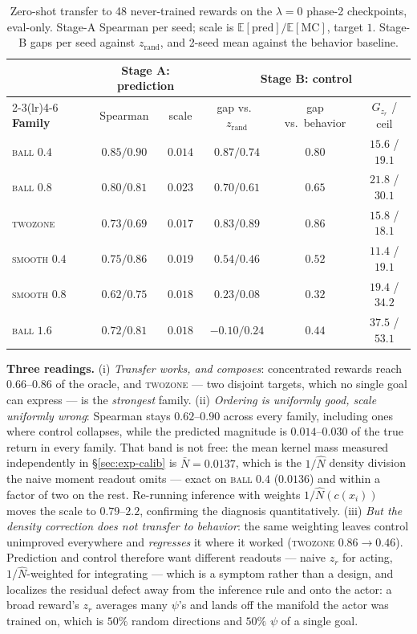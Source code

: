 \documentclass[10pt]{article}
\newcommand{\E}{\mathbb{E}}
\begin{document}
\begin{table}[h]
\centering\small
\setlength{\tabcolsep}{5pt}
\begin{tabular}{l c c c c c}
\toprule
& \multicolumn{2}{c}{\textbf{Stage A: prediction}} & \multicolumn{3}{c}{\textbf{Stage B: control}} \\
\cmidrule(lr){2-3}\cmidrule(lr){4-6}
\textbf{Family} & Spearman & scale & gap vs.\ $z_{\text{rand}}$ & gap vs.\ behavior & $G_{z_r}$ / ceil \\
\midrule
\textsc{ball} $0.4$   & $0.85/0.90$ & $0.014$ & $0.87/0.74$ & $0.80$ & $15.6$ / $19.1$ \\
\textsc{ball} $0.8$   & $0.80/0.81$ & $0.023$ & $0.70/0.61$ & $0.65$ & $21.8$ / $30.1$ \\
\textsc{twozone}      & $0.73/0.69$ & $0.017$ & $\mathbf{0.83/0.89}$ & $\mathbf{0.86}$ & $15.8$ / $18.1$ \\
\textsc{smooth} $0.4$ & $0.75/0.86$ & $0.019$ & $0.54/0.46$ & $0.52$ & $11.4$ / $19.1$ \\
\textsc{smooth} $0.8$ & $0.62/0.75$ & $0.018$ & $\mathbf{0.23/0.08}$ & $0.32$ & $19.4$ / $34.2$ \\
\textsc{ball} $1.6$   & $0.72/0.81$ & $0.018$ & $\mathbf{-0.10/0.24}$ & $0.44$ & $37.5$ / $53.1$ \\
\bottomrule
\end{tabular}
\caption{Zero-shot transfer to 48 never-trained rewards on the $\lambda{=}0$
phase-2 checkpoints, eval-only. Stage-A Spearman per seed; scale is
$\E[\text{pred}]/\E[\text{MC}]$, target $1$. Stage-B gaps per seed against
$z_{\text{rand}}$, and 2-seed mean against the behavior baseline.}
\label{tab:l2}
\end{table}

\textbf{Three readings.} (i) \emph{Transfer works, and composes}: concentrated
rewards reach $0.66$--$0.86$ of the oracle, and \textsc{twozone} --- two disjoint
targets, which no single goal can express --- is the \emph{strongest} family.
(ii) \emph{Ordering is uniformly good, scale uniformly wrong}: Spearman stays
$0.62$--$0.90$ across every family, including ones where control collapses, while
the predicted magnitude is $0.014$--$0.030$ of the true return in every family.
That band is not free: the mean kernel mass measured independently in
\S\ref{sec:exp-calib} is $\bar N = 0.0137$, which is the $1/\hat N$ density
division the naive moment readout omits --- exact on \textsc{ball} $0.4$
($0.0136$) and within a factor of two on the rest. Re-running inference
with weights $1/\hat N(c(x_i))$ moves the scale to $0.79$--$2.2$, confirming the
diagnosis quantitatively. (iii) \emph{But the density correction does not transfer
to behavior}: the same weighting leaves control unimproved everywhere and
\emph{regresses} it where it worked (\textsc{twozone} $0.86\to0.46$). Prediction
and control therefore want different readouts --- naive $z_r$ for acting,
$1/\hat N$-weighted for integrating --- which is a symptom rather than a design,
and localizes the residual defect away from the inference rule and onto the actor:
a broad reward's $z_r$ averages many $\psi$'s and lands off the manifold the actor
was trained on, which is $50\%$ random directions and $50\%$ $\psi$ of a single
goal.
\end{document}
